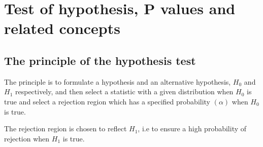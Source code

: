 \documentclass[12pt,a4paper]{article}
\theoremstyle{regla}
\theoremstyle{remark}
\theoremstyle{definition}
\theoremstyle{nonumberbreak}
\begin{document}
\section{Test of hypothesis, P values and related concepts}
\subsection{The principle of the hypothesis test}
\begin{fbox}
\begin{minipage}{0.97\textwidth}
The principle is to formulate a hypothesis and an alternative hypothesis, $H_0$ and $H_1$ respectively, and then select a statistic with a given distribution when $H_0$ is true and select a rejection region which has a specified probability $(\alpha)$ when $H_0$ is true. 

The rejection region is chosen to reflect $H_1$, i.e to ensure a high probability of rejection when $H_1$ is true.

\end{minipage}
\end{fbox}
\end{document}

